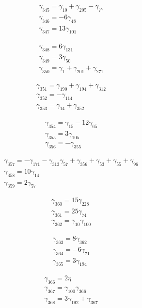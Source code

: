 \[\begin{aligned}\gamma_{345}=\gamma_{10} + \gamma_{205} - \gamma_{77}\\ \gamma_{346}=- 6 \gamma_{48}\\ \gamma_{347}=13 \gamma_{101}\end{aligned}\]

\[\begin{aligned}\gamma_{348}=6 \gamma_{131}\\ \gamma_{349}=3 \gamma_{50}\\ \gamma_{350}=\gamma_{1} + \gamma_{201} + \gamma_{271}\end{aligned}\]

\[\begin{aligned}\gamma_{351}=\gamma_{190} + \gamma_{194} + \gamma_{312}\\ \gamma_{352}=- \gamma_{114}\\ \gamma_{353}=\gamma_{14} + \gamma_{352}\end{aligned}\]

\[\begin{aligned}\gamma_{354}=\gamma_{15} - 12 \gamma_{65}\\ \gamma_{355}=3 \gamma_{105}\\ \gamma_{356}=- \gamma_{355}\end{aligned}\]

\[\begin{aligned}\gamma_{357}=- \gamma_{171} - \gamma_{313} \gamma_{57} + \gamma_{356} + \gamma_{53} + \gamma_{55} + \gamma_{96}\\ \gamma_{358}=10 \gamma_{14}\\ \gamma_{359}=2 \gamma_{57}\end{aligned}\]

\[\begin{aligned}\gamma_{360}=15 \gamma_{228}\\ \gamma_{361}=25 \gamma_{74}\\ \gamma_{362}=\gamma_{10} \gamma_{100}\end{aligned}\]

\[\begin{aligned}\gamma_{363}=8 \gamma_{362}\\ \gamma_{364}=- 6 \gamma_{71}\\ \gamma_{365}=3 \gamma_{194}\end{aligned}\]

\[\begin{aligned}\gamma_{366}=2 \eta \\ \gamma_{367}=\gamma_{100} \gamma_{366}\\ \gamma_{368}=3 \gamma_{192} + \gamma_{367}\end{aligned}\]

